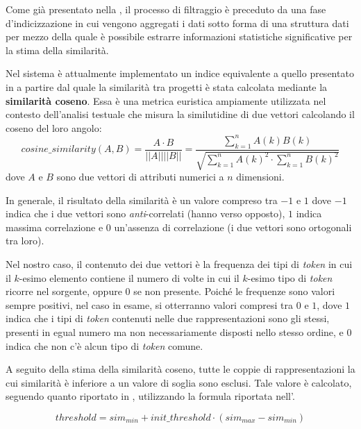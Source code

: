 Come già presentato nella , il processo di filtraggio è preceduto da una fase d'indicizzazione in cui vengono aggregati i dati sotto forma di una struttura dati per mezzo della quale è possibile estrarre informazioni statistiche significative per la stima della similarità.

Nel sistema è attualmente implementato un indice equivalente a quello presentato in  a partire dal quale la similarità tra progetti è stata calcolata mediante la \textbf{similarità coseno}.
%
Essa è una metrica euristica ampiamente utilizzata nel contesto dell'analisi testuale che misura la similutidine di due vettori calcolando il coseno del loro angolo: 
\begin{equation}
	cosine\_similarity(A,B) = \frac{A \cdot B}{||A|| ||B||} 
		= \frac{\sum_{k=1}^{n} A(k) B(k)}{\sqrt{\sum_{k=1}^{n}A(k)^2 \cdot \sum_{k=1}^{n} B(k)^2}}
\end{equation}
dove $A$ e $B$ sono due vettori di attributi numerici a $n$ dimensioni.

In generale, il risultato della similarità è un valore compreso tra $-1$ e $1$ dove $-1$ indica che i due vettori sono \textit{anti}-correlati (hanno verso opposto), $1$ indica massima correlazione e $0$ un'assenza di correlazione (i due vettori sono ortogonali tra loro).

Nel nostro caso, il contenuto dei due vettori è la frequenza dei tipi di \textit{token} in cui il $k$-esimo elemento contiene il numero di volte in cui il $k$-esimo tipo di \textit{token} ricorre nel sorgente, oppure $0$ se non presente.
%
Poiché le frequenze sono valori sempre positivi, nel caso in esame, si otterranno valori compresi tra $0$ e $1$, dove $1$ indica che i tipi di \textit{token} contenuti nelle due rappresentazioni sono gli stessi, presenti in egual numero ma non necessariamente disposti nello stesso ordine, e $0$ indica che non c'è alcun tipo di \textit{token} comune.

A seguito della stima della similarità coseno, tutte le coppie di rappresentazioni la cui similarità è inferiore a un valore di soglia sono esclusi.
%
Tale valore è calcolato, seguendo quanto riportato in \cite{es-plag}, utilizzando la formula riportata nell'.

\begin{equation}
\label{eq:cosine-filtering-threshold}	
	threshold = sim_{min} + init\_threshold \cdot (sim_{max} - sim_{min})
\end{equation}

